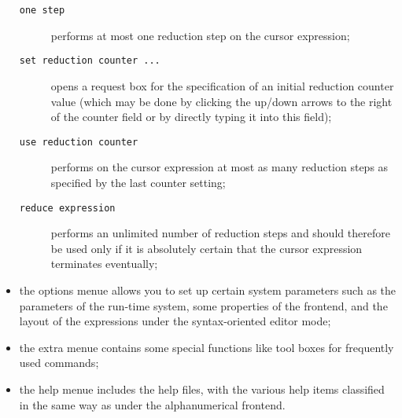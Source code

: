\begin{itemize}
\begin{description}
\item[{\tt one step}] performs at most one reduction step on the cursor expression;
\item[{\tt set reduction counter ...}] opens a request box for the specification of an
initial reduction counter value (which may be done by clicking the up/down arrows to
the right of the counter field or by directly typing it into this
field);
\item[{\tt use reduction counter}] performs on the cursor expression at most as many
reduction steps as specified by the last counter setting; 
\item[{\tt reduce expression}] performs an unlimited number of reduction steps and should
therefore be used only if it is absolutely certain that the  cursor expression 
 terminates eventually;
\end{description}
\item the {\sc options} menue allows you to set up certain system parameters
such as the parameters of the run-time system, some properties of the frontend, and
the layout of the expressions under the syntax-oriented editor mode;
\item the {\sc extra} menue contains some special functions like tool boxes for
frequently used commands;
\item the {\sc help} menue includes the help files, with the various help items
classified in the same way as under the alphanumerical frontend. 
\end{itemize}



